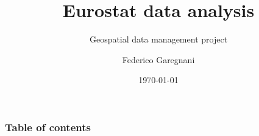 \documentclass{beamer}
\title[Geospatial Data Management]{Eurostat data analysis}
\subtitle{Geospatial data management project}
\author{Federico Garegnani}
\institute[UniMI]{Università degli Studi di Milano}
\date{\today}
\begin{document}
	\frame{\titlepage}
	
	\begin{frame}
		\frametitle{Table of contents}
		\tableofcontents
	\end{frame}
	
	
	
	
	
\end{document}
